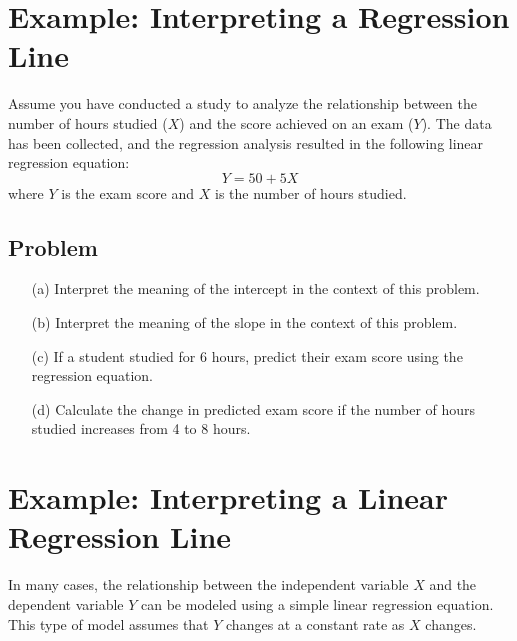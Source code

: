 \documentclass[11pt]{article}
\begin{document}
\begin{itemize}
\begin{center}
\end{center}

\end{itemize}


\section{Example: Interpreting a Regression Line}

Assume you have conducted a study to analyze the relationship between the number of hours studied (\(X\)) and the score achieved on an exam (\(Y\)). The data has been collected, and the regression analysis resulted in the following linear regression equation:
\[
Y = 50 + 5X
\]
where \(Y\) is the exam score and \(X\) is the number of hours studied.

\subsection*{Problem}

\begin{itemize}
    \item[(a)] Interpret the meaning of the intercept in the context of this problem.
    \item[(b)] Interpret the meaning of the slope in the context of this problem.
    \item[(c)] If a student studied for 6 hours, predict their exam score using the regression equation.
    \item[(d)] Calculate the change in predicted exam score if the number of hours studied increases from 4 to 8 hours.
\end{itemize}

\section{Example: Interpreting a Linear Regression Line}

In many cases, the relationship between the independent variable \(X\) and the dependent variable \(Y\) can be modeled using a simple linear regression equation. This type of model assumes that \(Y\) changes at a constant rate as \(X\) changes.
\end{document}
